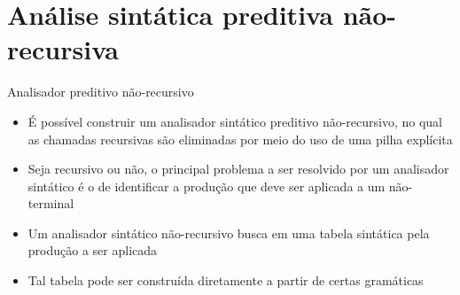\section{Análise sintática preditiva não-recursiva}

\begin{frame}[fragile]{Analisador preditivo não-recursivo}

    \begin{itemize}
        \item É possível construir um analisador sintático preditivo não-recursivo, no qual as chamadas recursivas são eliminadas por meio do uso de uma
            pilha explícita
        \pause

        \item Seja recursivo ou não, o principal problema a ser resolvido por um analisador sintático é o de identificar a produção que deve ser aplicada a
            um não-terminal
        \pause

        \item Um analisador sintático não-recursivo busca em uma tabela sintática pela produção a ser aplicada
        \pause

        \item Tal tabela pode ser construída diretamente a partir de certas gramáticas
    \end{itemize}

\end{frame}

